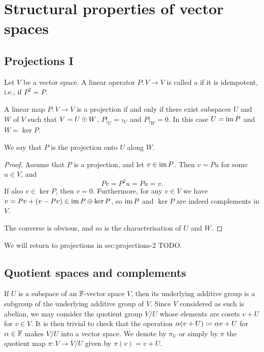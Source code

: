 \chapter{Structural properties of vector spaces}\label{testchapter}

\section{Projections I}

Let $V$ be a vector space. A linear operator $P \colon V \to V$ is called a  if it is idempotent, i.e., if $P^2 = P$.

\begin{proposition}
    \label{prop:projection-characterisation}
    A linear map $P \colon V \to V$ is a projection if and only if there exist subspaces $U$ and $W$ of $V$ such that $V = U \oplus W$, $P|_U = \iota_U$ and $P|_W = 0$. In this case $U = \operatorname{im} P$ and $W = \ker P$.
\end{proposition}
%
We say that $P$ is the projection onto $U$ along $W$.

\begin{proof}
    Assume that $P$ is a projection, and let $v \in \operatorname{im} P$. Then $v = Pu$ for some $u \in V$, and
    \begin{equation*}
        Pv
            = P^2 u
            = Pu
            = v.
    \end{equation*}
    If also $v \in \ker P$, then $v = 0$. Furthermore, for any $v \in V$ we have $v = Pv + (v - Pv) \in \operatorname{im} P \oplus \ker P$, so $\operatorname{im} P$ and $\ker P$ are indeed complements in $V$.

    The converse is obvious, and so is the characterisation of $U$ and $W$.
\end{proof}

We will return to projections in {sec:projections-2} TODO.


\section{Quotient spaces and complements}

If $U$ is a subspace of an $\mathbb{F}$-vector space $V$, then its underlying additive group is a subgroup of the underlying additive group of $V$. Since $V$ considered as such is abelian, we may consider the quotient group $V/U$ whose elements are cosets $v + U$ for $v \in V$. It is then trivial to check that the operation $\alpha(v + U) \coloneqq \alpha v + U$ for $\alpha \in \mathbb{F}$ makes $V/U$ into a vector space. We denote by $\pi_U$ or simply by $\pi$ the quotient map $\pi \colon V \to V/U$ given by $\pi(v) = v + U$.

